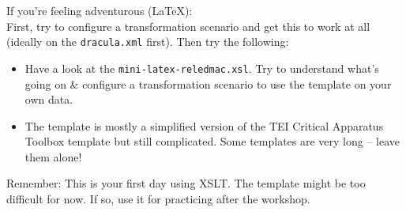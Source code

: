 \begin{frame}[standout]
    \alert{If you're feeling adventurous (\LaTeX{}):} \\
    \small
    First, try to configure a transformation scenario and get this to work at all (ideally on the \texttt{dracula.xml} first). Then try the following:
    \begin{itemize}\small
        \item Have a look at the \texttt{mini-latex-reledmac.xsl}. Try to understand what's going on \& configure a transformation scenario to use the template on your own data. 
        \item The template is mostly a simplified version of the TEI Critical Apparatus Toolbox template but still complicated. Some templates are very long -- leave them alone!
    \end{itemize} 
    \alert{Remember:} This is your first day using XSLT. The template might be too difficult for now. If so, use it for practicing after the workshop. 
\end{frame}






